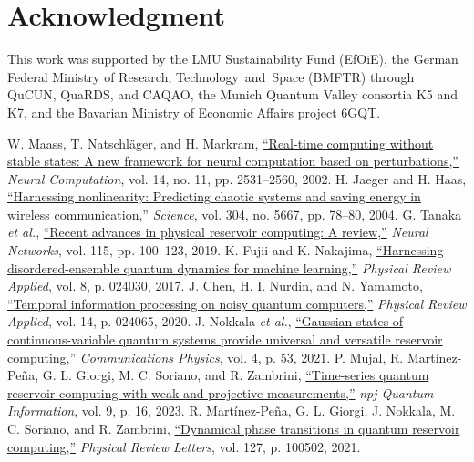 \documentclass[10pt,conference]{IEEEtran}
\newif\ifQRCauthorversion
\newcommand{\QRCdoi}[2]{\href{#1}{#2}}
\newcommand{\QRCdoi}[2]{#2}
\begin{document}
\section*{Acknowledgment}
This work was supported by the LMU Sustainability Fund (EfOiE), the German Federal Ministry of Research, \mbox{Technology and Space} (BMFTR) through QuCUN, QuaRDS, and CAQAO, the Munich Quantum Valley consortia K5 and K7, and the Bavarian Ministry of Economic Affairs project 6GQT.


{\footnotesize
\begin{thebibliography}{99}
\ifQRCauthorversion
\setlength{\itemsep}{-0.1ex}
\else
\setlength{\itemsep}{-0.1ex}
\fi
\setlength{\parskip}{0pt}
 W. Maass, T. Natschl\"{a}ger, and H. Markram, \QRCdoi{https://doi.org/10.1162/089976602760407955}{``Real-time computing without stable states: A new framework for neural computation based on perturbations,''} \emph{Neural Computation}, vol. 14, no. 11, pp. 2531--2560, 2002.
 H. Jaeger and H. Haas, \QRCdoi{https://doi.org/10.1126/science.1091277}{``Harnessing nonlinearity: Predicting chaotic systems and saving energy in wireless communication,''} \emph{Science}, vol. 304, no. 5667, pp. 78--80, 2004.
 G. Tanaka \emph{et al.}, \QRCdoi{https://doi.org/10.1016/j.neunet.2019.03.005}{``Recent advances in physical reservoir computing: A review,''} \emph{Neural Networks}, vol. 115, pp. 100--123, 2019.
 K. Fujii and K. Nakajima, \QRCdoi{https://doi.org/10.1103/PhysRevApplied.8.024030}{``Harnessing disordered-ensemble quantum dynamics for machine learning,''} \emph{Physical Review Applied}, vol. 8, p. 024030, 2017.
 J. Chen, H. I. Nurdin, and N. Yamamoto, \QRCdoi{https://doi.org/10.1103/PhysRevApplied.14.024065}{``Temporal information processing on noisy quantum computers,''} \emph{Physical Review Applied}, vol. 14, p. 024065, 2020.
 J. Nokkala \emph{et al.}, \QRCdoi{https://doi.org/10.1038/s42005-021-00556-w}{``Gaussian states of continuous-variable quantum systems provide universal and versatile reservoir computing,''} \emph{Communications Physics}, vol. 4, p. 53, 2021.
 P. Mujal, R. Mart\'{i}nez-Pe\~{n}a, G. L. Giorgi, M. C. Soriano, and R. Zambrini, \QRCdoi{https://doi.org/10.1038/s41534-023-00682-z}{``Time-series quantum reservoir computing with weak and projective measurements,''} \emph{npj Quantum Information}, vol. 9, p. 16, 2023.
 R. Mart\'{i}nez-Pe\~{n}a, G. L. Giorgi, J. Nokkala, M. C. Soriano, and R. Zambrini, \QRCdoi{https://doi.org/10.1103/PhysRevLett.127.100502}{``Dynamical phase transitions in quantum reservoir computing,''} \emph{Physical Review Letters}, vol. 127, p. 100502, 2021.

\end{thebibliography}}
\end{document}

